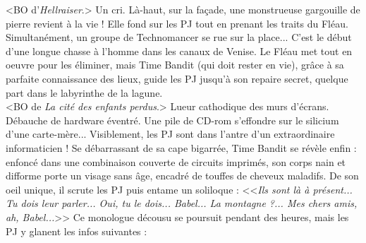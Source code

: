 \documentclass[11pt,twoside,a4paper]{book}
\begin{document}
<BO d'\emph{Hellraiser}.> Un cri. L{\`a}-haut, sur la fa\c{c}ade, une monstrueuse gargouille de pierre revient {\`a} la vie ! Elle fond sur les PJ tout en prenant les traits du Fl{\'e}au. Simultan{\'e}ment, un groupe de Technomancer se rue sur la place... C'est le d{\'e}but d'une longue chasse {\`a} l'homme dans les canaux de Venise. Le Fl{\'e}au met tout en oeuvre pour les {\'e}liminer, mais Time Bandit (qui doit rester en vie), gr{\^a}ce {\`a} sa parfaite connaissance des lieux, guide les PJ jusqu'{\`a} son repaire secret, quelque part dans le labyrinthe de la lagune.~\\

<BO de \emph{La cit{\'e} des enfants perdus}.> Lueur cathodique des murs d'{\'e}crans. D{\'e}bauche de hardware {\'e}ventr{\'e}. Une pile de CD-rom s'effondre sur le silicium d'une carte-m{\`e}re... Visiblement, les PJ sont dans l'antre d'un extraordinaire informaticien ! Se d{\'e}barrassant de sa cape bigarr{\'e}e, Time Bandit se r{\'e}v{\`e}le enfin : enfonc{\'e} dans une combinaison couverte de circuits imprim{\'e}s, son corps nain et difforme porte un visage sans {\^a}ge, encadr{\'e} de touffes de cheveux maladifs. De son oeil unique, il scrute les PJ puis entame un soliloque : <<\emph{Ils sont l{\`a} {\`a} pr{\'e}sent... Tu dois leur parler... Oui, tu le dois... Babel... La montagne ?... Mes chers amis, ah, Babel...}>> Ce monologue d{\'e}cousu se poursuit pendant des heures, mais les PJ y glanent les infos suivantes :~\\

\clearpage
\end{document}
